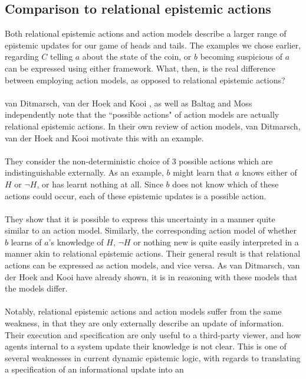 \subsection{Comparison to relational epistemic actions} \label{epi_compare}
Both relational epistemic actions \cite{hoek2008dynamic} and action models
\cite{baltag1998lpa} describe a larger range of epistemic updates for our game of heads and tails.
The examples we chose earlier, regarding $C$ telling $a$ about the state of the
coin, or $b$ becoming suspicious of $a$ can be expressed using either framework.
What, then, is the real difference between employing action models, as opposed
to relational epistemic actions?\\
\\
van Ditmarsch, van der Hoek and Kooi \cite{hoek2008dynamic}, as well as Baltag and Moss
\cite{baltag2005programs} independently
note that the ``possible actions" of action models  are actually relational
epistemic actions.
In their own review of action models, van Ditmarsch, van der Hoek and Kooi
motivate this with an example.\\
\\
They consider the non-deterministic choice of 3 possible actions which are
indistinguishable externally.
As an example, $b$ might learn that $a$ knows either of $H$ or $\neg H$, or has
learnt nothing at all.
Since $b$ does not know which of these actions could occur, each of these
epistemic updates is a possible action.\\
\\
They show that it is possible to express this uncertainty in a manner quite similar
to an action model.
Similarly, the corresponding action model of whether $b$ learns of $a$'s
knowledge of $H$, $\neg H$ or nothing new is quite easily interpreted in a manner
akin to relational epistemic actions.
Their general result is that relational actions can be expressed as action
models, and vice versa.
As van Ditmarsch, van der Hoek and Kooi have already shown, it is in reasoning
with these models that the models differ.\\
\\
Notably, relational epistemic actions and action models suffer from the same
weakness, in that they are only externally describe an update of information.
Their execution and specification are only useful to a third-party viewer, and
how agents internal to a system update their knowledge is not clear.
This is one of several weaknesses in current dynamic epistemic logic, with
regards to translating a specification of an informational update into an
